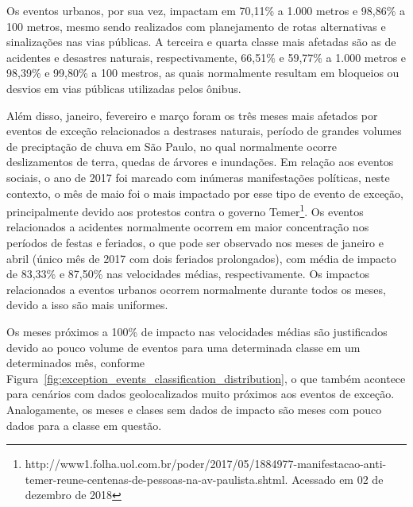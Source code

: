 \documentclass[
	12pt,				%
	oneside,			%
	a4paper,			%
	english,			%
	brazil				%
	]{abntex2ppgsi}
\begin{document}
{{{Os eventos urbanos, por sua vez, impactam em 70,11\% a 1.000 metros e 98,86\% a 100 metros, mesmo sendo realizados com planejamento de rotas alternativas e sinalizações nas vias públicas. A terceira e quarta classe mais afetadas são as de acidentes e desastres naturais, respectivamente, 66,51\% e 59,77\% a 1.000 metros e 98,39\% e 99,80\% a 100 mestros, as quais normalmente resultam em bloqueios ou desvios em vias públicas utilizadas pelos ônibus. 

Além disso, janeiro, fevereiro e março foram os três meses mais afetados por eventos de exceção relacionados a destrases naturais, período de grandes volumes de preciptação de chuva em São Paulo, no qual normalmente ocorre deslizamentos de terra, quedas de árvores e inundações.  Em relação aos eventos sociais, o ano de 2017 foi marcado com inúmeras manifestações políticas, neste contexto, o mês de maio foi o mais impactado por esse tipo de evento de exceção, principalmente devido aos protestos contra o governo Temer\footnote{{http://www1.folha.uol.com.br/poder/2017/05/1884977-manifestacao-anti-temer-reune-centenas-de-pessoas-na-av-paulista.shtml}. Acessado em 02 de dezembro de 2018}. Os eventos relacionados a acidentes normalmente ocorrem em maior concentração nos períodos de festas e feriados, o que pode ser observado nos meses de janeiro e abril (único mês de 2017 com dois feriados prolongados), com média de impacto de 83,33\% e 87,50\% nas velocidades médias, respectivamente.  Os impactos relacionados a eventos urbanos ocorrem normalmente durante todos os meses, devido a isso são mais uniformes.

Os meses próximos a 100\% de impacto nas velocidades médias são justificados devido ao pouco volume de eventos para uma determinada classe em um determinados mês, conforme Figura~\ref{fig:exception_events_classification_distribution}, o que também acontece para cenários com dados geolocalizados muito próximos aos eventos de exceção. Analogamente, os meses e clases sem dados de impacto são meses com pouco dados para a classe em questão. 


}}}
\end{document}
